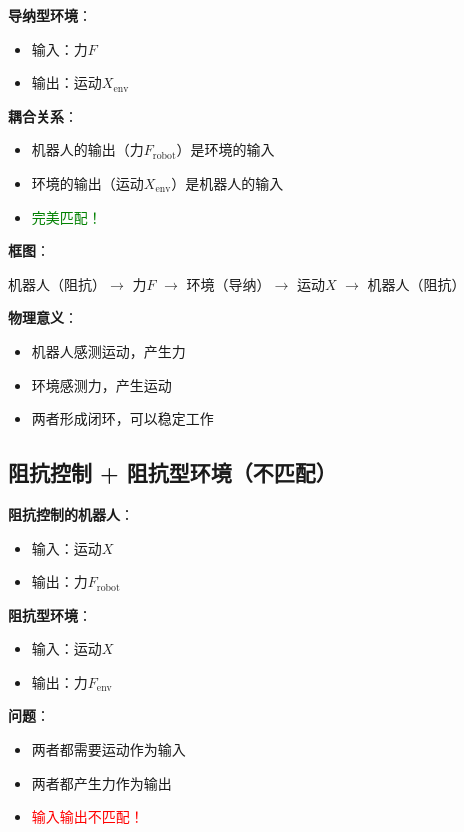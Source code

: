 \documentclass[12pt,a4paper]{article}
\begin{document}
\textbf{导纳型环境}：
\begin{itemize}
\item 输入：力$F$
\item 输出：运动$X_{\text{env}}$
\end{itemize}

\textbf{耦合关系}：
\begin{itemize}
\item 机器人的输出（力$F_{\text{robot}}$）是环境的输入
\item 环境的输出（运动$X_{\text{env}}$）是机器人的输入
\item \textcolor{green}{完美匹配！}
\end{itemize}

\textbf{框图}：
\begin{center}
机器人（阻抗）$\to$ 力$F$ $\to$ 环境（导纳）$\to$ 运动$X$ $\to$ 机器人（阻抗）
\end{center}

\textbf{物理意义}：
\begin{itemize}
\item 机器人感测运动，产生力
\item 环境感测力，产生运动
\item 两者形成闭环，可以稳定工作
\end{itemize}

\subsection{阻抗控制 + 阻抗型环境（不匹配）}

\textbf{阻抗控制的机器人}：
\begin{itemize}
\item 输入：运动$X$
\item 输出：力$F_{\text{robot}}$
\end{itemize}

\textbf{阻抗型环境}：
\begin{itemize}
\item 输入：运动$X$
\item 输出：力$F_{\text{env}}$
\end{itemize}

\textbf{问题}：
\begin{itemize}
\item 两者都需要运动作为输入
\item 两者都产生力作为输出
\item \textcolor{red}{输入输出不匹配！}
\end{itemize}
\end{document}
